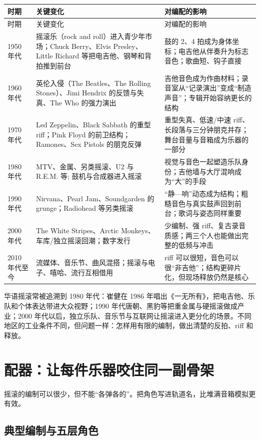 \begin{longtable}{p{}p{}p{}}
\toprule
时期 & 关键变化 & 对编配的影响 \\
\midrule
\endfirsthead
\toprule
时期 & 关键变化 & 对编配的影响 \\
\midrule
\endhead
1950 年代 & 摇滚乐（rock and roll）进入青少年市场；Chuck Berry、Elvis Presley、Little Richard 等把电吉他、钢琴和背拍推到前台 & 鼓的 2、4 拍成为身体坐标；电吉他从伴奏升为标志音色；歌曲短、钩子直接 \\
1960 年代 & 英伦入侵（The Beatles、The Rolling Stones）、Jimi Hendrix 的反馈与失真、The Who 的强力演出 & 吉他音色成为作曲材料；录音室从“记录演出”变成“制造声音”；专辑开始容纳更长的结构 \\
1970 年代 & Led Zeppelin、Black Sabbath 的重型 riff；Pink Floyd 的前卫结构；Ramones、Sex Pistols 的朋克反弹 & 重型失真、低速/中速 riff、长段落与三分钟朋克并存；舞台音量与音箱成为乐器的一部分 \\
1980 年代 & MTV、金属、另类摇滚、U2 与 R.E.M. 等; 鼓机与合成器进入摇滚 & 视觉与音色一起塑造乐队身份；吉他墙与大厅混响成为“大”的手段 \\
1990 年代 & Nirvana、Pearl Jam、Soundgarden 的 grunge；Radiohead 等另类摇滚 & “静—响”动态成为结构；粗糙音色与真实鼓声回到前台；歌词与姿态同样重要 \\
2000 年代 & The White Stripes、Arctic Monkeys、车库/独立摇滚回潮；数字发行 & 少编制、强 riff、复古录音质感；两三个人也能做出完整的低频与冲击 \\
2010 年代至今 & 流媒体、音乐节、曲风混搭；摇滚与电子、嘻哈、流行互相借用 & riff 可以很短，音色可以很“非吉他”；结构更碎片化，但现场释放仍然是核心 \\
\bottomrule
\end{longtable}

华语摇滚常被追溯到 1980 年代：崔健在 1986 年唱出《一无所有》，把电吉他、乐队和个体表达带进大众视野；1990 年代唐朝、黑豹等把重金属与硬摇滚做成产业；2000 年代以后，独立乐队、音乐节与互联网让摇滚进入更分化的场景。不同地区的工业条件不同，但问题一样：怎样用有限的编制，做出清楚的反拍、riff 和释放。

\section{配器：让每件乐器咬住同一副骨架}
\label{sec:rock-craft}

摇滚的编制可以很少，但不能“各弹各的”。把角色写进轨道名，比堆满音箱模拟更有效。

\subsection{典型编制与五层角色}
\label{sec:rock-instrumentation}

